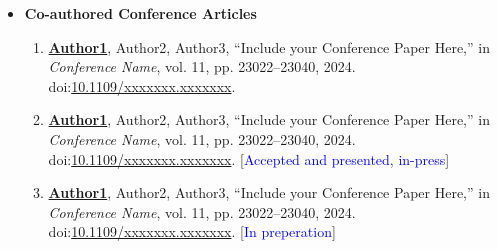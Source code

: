 \begin{itemize}
	\item \textbf{Co-authored Conference Articles}
	\renewcommand{\theenumi}{C\arabic{enumi}}
	\begin{enumerate}
		\small
		\setcounter{enumi}{3}
		\item{\textbf{\underline{Author1}}, Author2, Author3,  “Include your Conference Paper Here,” in \textit{Conference Name}, vol. 11, pp. 23022–23040, 2024. doi:\href{https://ieeexplore.ieee.org/document/9551398}{10.1109/xxxxxxx.xxxxxxx}.}
		\item{\textbf{\underline{Author1}}, Author2, Author3,  “Include your Conference Paper Here,” in \textit{Conference Name}, vol. 11, pp. 23022–23040, 2024. doi:\href{https://ieeexplore.ieee.org/document/9551398}{10.1109/xxxxxxx.xxxxxxx}.} [\textcolor{blue}{Accepted and presented, in-press}]       \vspace{2.0mm}
		\item{\textbf{\underline{Author1}}, Author2, Author3,  “Include your Conference Paper Here,” in \textit{Conference Name}, vol. 11, pp. 23022–23040, 2024. doi:\href{https://ieeexplore.ieee.org/document/9551398}{10.1109/xxxxxxx.xxxxxxx}.} [\textcolor{blue}{In preperation}]
	\end{enumerate}
\end{itemize}



